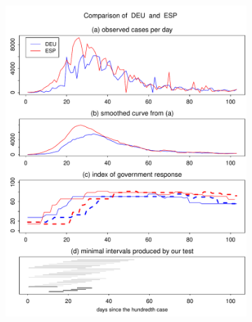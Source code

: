 \documentclass[a4paper,12pt]{article}
\numberwithin{equation}{section}
\begin{document}
\begin{figure}[t!]
\begin{subfigure}[b]{0.475\textwidth}
\includegraphics[width=\textwidth]{plots/DEU_vs_ESP}
\end{subfigure}\hspace{0.25cm}
\begin{subfigure}[b]{0.475\textwidth}

\end{subfigure}
\end{figure}
\end{document}
